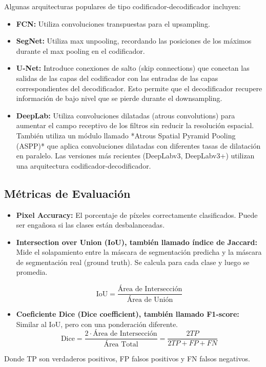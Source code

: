 \documentclass{article}
\begin{document}
Algunas arquitecturas populares de tipo codificador-decodificador incluyen:

\begin{itemize}
    \item \textbf{FCN:}  Utiliza convoluciones transpuestas para el upsampling.
    \item \textbf{SegNet:}  Utiliza max unpooling, recordando las posiciones de los máximos durante el max pooling en el codificador.
    \item \textbf{U-Net:}  Introduce conexiones de salto (skip connections) que conectan las salidas de las capas del codificador con las entradas de las capas correspondientes del decodificador.  Esto permite que el decodificador recupere información de bajo nivel que se pierde durante el downsampling.
    \item \textbf{DeepLab:}  Utiliza convoluciones dilatadas (atrous convolutions) para aumentar el campo receptivo de los filtros sin reducir la resolución espacial. También utiliza un módulo llamado *Atrous Spatial Pyramid Pooling (ASPP)* que aplica convoluciones dilatadas con diferentes tasas de dilatación en paralelo. Las versiones más recientes (DeepLabv3, DeepLabv3+) utilizan una arquitectura codificador-decodificador.
\end{itemize}

\subsection{Métricas de Evaluación}

\begin{itemize}
    \item \textbf{Pixel Accuracy:}  El porcentaje de píxeles correctamente clasificados.  Puede ser engañosa si las clases están desbalanceadas.
    \item \textbf{Intersection over Union (IoU), también llamado índice de Jaccard:}  Mide el solapamiento entre la máscara de segmentación predicha y la máscara de segmentación real (ground truth). Se calcula para cada clase y luego se promedia.

    \[
    \text{IoU} = \frac{\text{Área de Intersección}}{\text{Área de Unión}}
    \]
    \item \textbf{Coeficiente Dice (Dice coefficient), también llamado F1-score:}  Similar al IoU, pero con una ponderación diferente.
     \[
        \text{Dice} = \frac{2 \cdot \text{Área de Intersección}}{\text{Área Total}} = \frac{2TP}{2TP + FP + FN}
    \]
\end{itemize}
Donde TP son verdaderos positivos, FP falsos positivos y FN falsos negativos.
\end{document}
